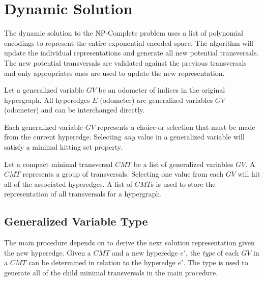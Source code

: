 















\chapter{Dynamic Solution}\label{chapter:dynamic}

The dynamic solution to the NP-Complete problem uses a list of polynomial encodings to represent the entire exponential encoded space. The  algorithm will update the individual representations and generate all new potential transversals. The new potential transversals are validated against the previous transversals and only appropriates ones are used to update the new representation.

\begin{definition}
Let a generalized variable $GV$ be an odometer of indices in the original hypergraph. All hyperedges $E$ (odometer) are generalized variables $GV$ (odometer) and can be interchanged directly.
\end{definition}

Each generalized variable $GV$ represents a choice or selection that must be made from the current hyperedge. Selecting \emph{any} value in a generalized variable will satisfy a minimal hitting set property. 

\begin{definition}
Let a compact minimal transversal $CMT$ be a list of generalized variables $GV$. A $CMT$ represents a group of transversals. Selecting one value from each $GV$ will hit all of the associated hyperedges. A list of $CMT$s is used to store the representation of all transversals for a hypergraph.
\end{definition}


\section{Generalized Variable Type}

The main procedure  depends on  to  derive the next solution representation given the new hyperedge. Given a $CMT$ and a new hyperedge $e'$, the \textit{type} of each $GV$ in a $CMT$ can be determined in relation to the hyperedge $e'$. The type is used to generate all of the child minimal transversals in the main procedure.

